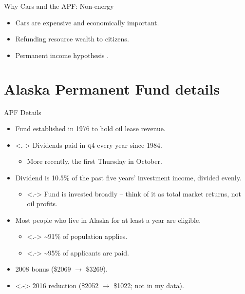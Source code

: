 \documentclass[aspectratio=169]{beamer}
\begin{document}
\begin{frame}{Why Cars and the APF: Non-energy}
	\begin{itemize}
		\item Cars are expensive and economically important.
		\item Refunding resource wealth to citizens.
		\item Permanent income hypothesis \parencite{hsieh2003}.
	\end{itemize}
\end{frame}


\section[APF Details]{Alaska Permanent Fund details}
\begin{frame}{APF Details}
	\begin{itemize}[<+->]
		\item Fund established in 1976 to hold oil lease revenue.
		\item<.-> Dividends paid in \textsc{q}4 every year since 1984.
		\begin{itemize}
			\item More recently, the first Thursday in October.
		\end{itemize}
		\item Dividend is 10.5\% of the past five years' investment income, divided evenly.
		\begin{itemize}
			\item<.-> Fund is invested broadly -- think of it as total market returns, not oil profits.
		\end{itemize}
		\item Most people who live in Alaska for at least a year are eligible.
		\begin{itemize}
			\item<.-> \textasciitilde91\% of population applies.
			\item<.-> \textasciitilde95\% of applicants are paid.
		\end{itemize}
		\item 2008 bonus (\$2069 $\rightarrow$ \$3269).
		\item<.-> 2016 reduction (\$2052 $\rightarrow$ \$1022; not in my data).
	\end{itemize}
\end{frame}
\end{document}
